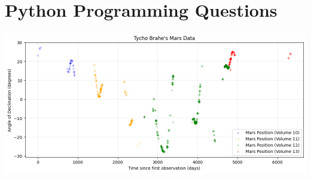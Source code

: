 \documentclass[12pt]{article}
\begin{document}
\section{Python Programming Questions}

\includegraphics[scale=0.5]{images/proj00_plot_MarsDeclination.png}
\end{document}
